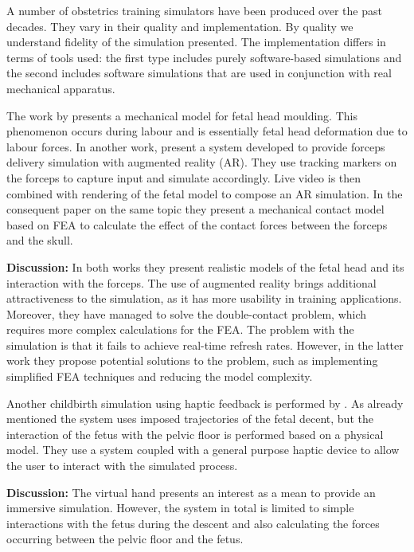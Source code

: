 A number of obstetrics training simulators have been produced over the past decades. They vary in their quality and implementation. By quality we understand fidelity of the simulation presented. The implementation differs in terms of tools used: the first type includes purely software-based simulations and the second includes software simulations that are used in conjunction with real mechanical apparatus.

The work by \textbf{\citet{RUDY2001}} presents a mechanical model for fetal head moulding. This phenomenon occurs during labour and is essentially fetal head deformation due to labour forces. In another work, \citet{RUDY2004} present a system developed to provide forceps delivery simulation with augmented reality (AR). They use tracking markers on the forceps to capture input and simulate accordingly. Live video is then combined with rendering of the fetal model to compose an AR simulation. In the consequent paper on the same topic they present a mechanical contact model based on FEA to calculate the effect of the contact forces between the forceps and the skull.

\textbf{Discussion:} In both works they present realistic models of the fetal head and its interaction with the forceps. The use of augmented reality brings additional attractiveness to the simulation, as it has more usability in training applications. Moreover, they have managed to solve the double-contact problem, which requires more complex calculations for the FEA.
The problem with the simulation is that it fails to achieve real-time refresh rates. However, in the latter work they propose potential solutions to the problem, such as implementing simplified FEA techniques and reducing the model complexity.

Another childbirth simulation using haptic feedback is performed by \textbf{\citet{KheddarImposedTraj}}. As already mentioned the system uses imposed trajectories of the fetal decent, but the interaction of the fetus with the pelvic floor is performed based on a physical model. They use a system coupled with a general purpose haptic device to allow the user to interact with the simulated process.

\textbf{Discussion:} The virtual hand presents an interest as a mean to provide an immersive simulation. However, the system in total is limited to simple interactions with the fetus during the descent and also calculating the forces occurring between the pelvic floor and the fetus.
%

